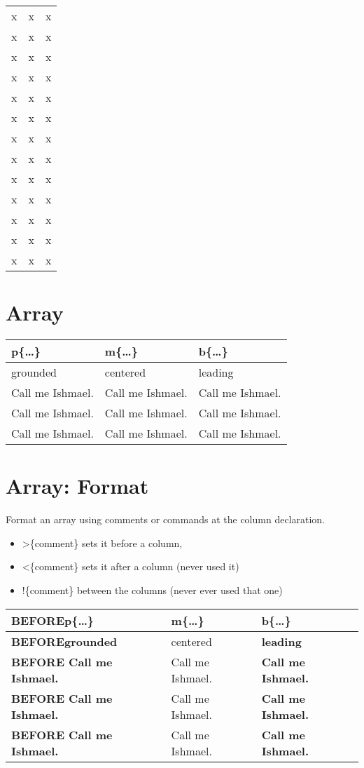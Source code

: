 \documentclass[a4paper,10pt]{scrartcl}
\begin{document}
\begin{longtable}{|l|cc|}
x & x & x\\ 
x & x & x\\ 
x & x & x\\ 
x & x & x\\ 
x & x & x\\ 
x & x & x\\ 
x & x & x\\ 
x & x & x\\ 
x & x & x\\ 
x & x & x\\ 
x & x & x\\ 
x & x & x\\ 
x & x & x\\ 
\end{longtable}


\section{Array}
\setlength{\extrarowheight}{4pt}
\begin{tabular}{|p{2cm}|m{2cm}|b{2cm}|} \hline
p\{\dots\} & m\{\dots\} & b\{\dots\} \\ \hline
grounded & centered & leading \\ \hline
Call me Ishmael. & Call me Ishmael. & Call me Ishmael. \\ \hline
Call me Ishmael. & Call me Ishmael. & Call me Ishmael. \\ \hline
Call me Ishmael. & Call me Ishmael. & Call me Ishmael. \\ \hline
\end{tabular}
\newline


\section{Array: Format}
Format an array using comments or commands at the column declaration. 
\begin{itemize}
 \item >\{comment\} sets it before a column,
 \item <\{comment\} sets it after a column (never used it)
 \item !\{comment\} between the columns (never ever used that one)
\end{itemize}

\setlength{\extrarowheight}{4pt}
\begin{tabular}{|>{\bfseries BEFORE}p{2cm}|m{2cm}|>{\large\bfseries}b{2cm}|} \hline
p\{\dots\} & m\{\dots\} & b\{\dots\} \\ \hline
grounded & centered & leading \\ \hline
Call me Ishmael. & Call me Ishmael. & Call me Ishmael. \\ \hline
Call me Ishmael. & Call me Ishmael. & Call me Ishmael. \\ \hline
Call me Ishmael. & Call me Ishmael. & Call me Ishmael. \\ \hline
\end{tabular}
\newline
\end{document}
